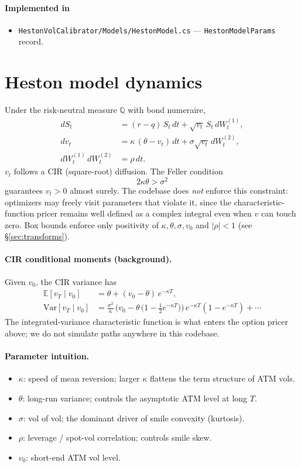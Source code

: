 \documentclass[11pt,a4paper]{article}
\begin{document}
\paragraph*{Implemented in}
\begin{itemize}
\item \texttt{HestonVolCalibrator/Models/HestonModel.cs} --- \texttt{HestonModelParams} record.
\end{itemize}

\section{Heston model dynamics}
Under the risk-neutral measure $\mathbb{Q}$ with bond numeraire,
\begin{align*}
dS_t &= (r - q)\, S_t\, dt + \sqrt{v_t}\, S_t\, dW^{(1)}_t,\\
dv_t &= \kappa\,(\theta - v_t)\, dt + \sigma\sqrt{v_t}\, dW^{(2)}_t,\\
dW^{(1)}_t\, dW^{(2)}_t &= \rho\, dt.
\end{align*}
$v_t$ follows a CIR (square-root) diffusion. The Feller condition
\[
2 \kappa \theta > \sigma^2
\]
guarantees $v_t > 0$ almost surely. The codebase does \emph{not} enforce this
constraint: optimizers may freely visit parameters that violate it, since the
characteristic-function pricer remains well defined as a complex integral even
when $v$ can touch zero. Box bounds enforce only positivity of $\kappa,\theta,\sigma,v_0$
and $|\rho| < 1$ (see \S\ref{sec:transforms}).

\paragraph*{CIR conditional moments (background).} Given $v_0$, the CIR variance has
\begin{align*}
\mathbb{E}[v_T \mid v_0] &= \theta + (v_0 - \theta)\, e^{-\kappa T},\\
\mathrm{Var}[v_T \mid v_0] &= \frac{\sigma^2}{\kappa}\,\Big(v_0 - \theta\,\big(1 - \tfrac12 e^{-\kappa T}\big)\Big)\, e^{-\kappa T}(1 - e^{-\kappa T}) + \cdots
\end{align*}
The integrated-variance characteristic function is what enters the option pricer
above; we do not simulate paths anywhere in this codebase.

\paragraph*{Parameter intuition.}
\begin{itemize}
\item $\kappa$: speed of mean reversion; larger $\kappa$ flattens the term
structure of ATM vols.
\item $\theta$: long-run variance; controls the asymptotic ATM level at long $T$.
\item $\sigma$: vol of vol; the dominant driver of smile convexity (kurtosis).
\item $\rho$: leverage / spot-vol correlation; controls smile skew.
\item $v_0$: short-end ATM vol level.
\end{itemize}
\end{document}

